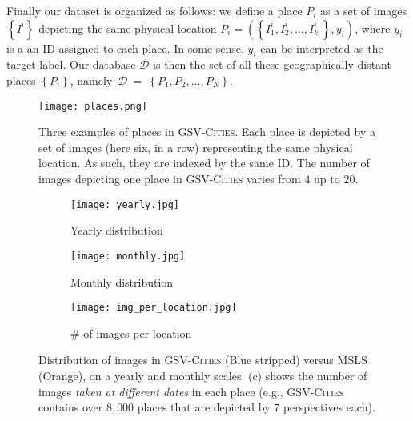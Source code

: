 \documentclass{article}
\begin{document}
Finally our dataset is organized as follows: we define a place $P_i$ as a set of images $\left\{I^i\right\}$ depicting the same physical location $P_i = \left( \left\{I_1^i, I_2^i, ..., I_{k_i}^i\right\}, y_i \right)$, where $y_i$ is a an ID assigned to each place. In some sense, $y_i$ can be interpreted as the target label.
Our database $\mathcal{D}$ is then the set of all these geographically-distant places $\left\{P_i\right\}$, namely~$\mathcal{D}~=~\left\{P_1, P_2, ..., P_N\right\}$.

\begin{figure*}[t!]
\centering
\texttt{[image: places.png]}
\caption{Three examples of places in \textsc{GSV-Cities}. Each place is depicted by a set of images (here six, in a row) representing the same physical location. As such, they are indexed by the same ID. The number of images depicting one place in \textsc{GSV-Cities} varies from $4$ up to $20$.}
\label{fig:places_sample}
\end{figure*}
\begin{figure*}[t]\begin{subfigure}[Yearly distribution]{0.3\textwidth}
         \centering
         \texttt{[image: yearly.jpg]}
         \caption{Yearly distribution}
         \label{fig:stats2}
\end{subfigure}
     \hfill
\begin{subfigure}[Monthly distribution]{0.3\textwidth}
         \centering
         \texttt{[image: monthly.jpg]}
         \caption{Monthly distribution}
         \label{fig:stats3}
\end{subfigure}
  \hfill
\begin{subfigure}[\# of images per location]{0.3\textwidth}
         \centering
         \texttt{[image: img\_per\_location.jpg]}
         \caption{\# of images per location}
         \label{fig:stats1}
\end{subfigure}
\caption{Distribution of images in \textsc{GSV-Cities} (Blue stripped) versus MSLS (Orange), on a yearly and monthly scales. (c) shows the number of images \textit{taken at different dates} in each place (e.g., \textsc{GSV-Cities} contains over $8,000$ places that are depicted by $7$ perspectives each).}
\label{fig:2}
\end{figure*}
\end{document}

